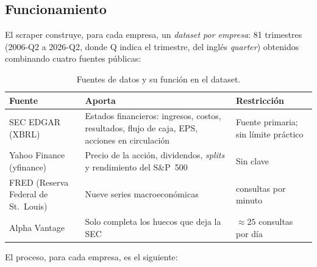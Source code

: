 \documentclass[12pt,letterpaper,oneside]{report}
\renewcommand{\_}{\UnderscoreOriginal\allowbreak}
\begin{document}
\subsection{Funcionamiento}

El scraper construye, para cada empresa, un \emph{dataset por empresa}: 81 trimestres (2006-Q2 a 2026-Q2, donde Q indica el trimestre, del inglés \textit{quarter}) obtenidos combinando cuatro fuentes públicas:

\begin{table}[H]
\centering
\caption{Fuentes de datos y su función en el dataset.}
\label{tab:fuentes}
\begin{tabular}{@{}>{\raggedright}p{3.2cm}>{\raggedright}p{6.3cm}>{\raggedright\arraybackslash}p{4.2cm}@{}}
\toprule
Fuente & Aporta & Restricción \\
\midrule
SEC EDGAR (XBRL) & Estados financieros: ingresos, costos, resultados, flujo de caja, EPS, acciones en circulación & Fuente primaria; sin límite práctico \\
Yahoo Finance (yfinance) & Precio de la acción, dividendos, \textit{splits} y rendimiento del S\&P~500 & Sin clave \\
FRED (Reserva Federal de St.~Louis) & Nueve series macroeconómicas & 120 consultas por minuto \\
Alpha Vantage & Solo completa los huecos que deja la SEC & $\approx 25$ consultas por día \\
\bottomrule
\end{tabular}
\end{table}

El proceso, para cada empresa, es el siguiente:
\end{document}
